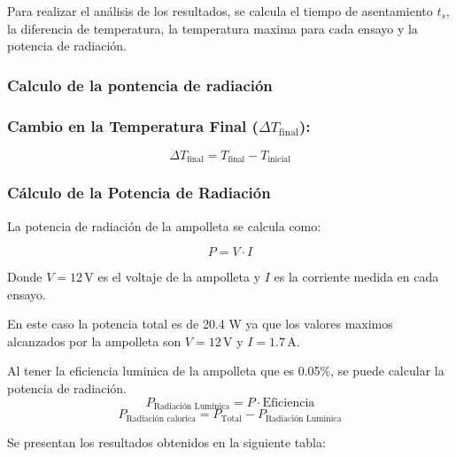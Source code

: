 \documentclass[spanish, a4paper, 11pt]{article}
\begin{document}
Para realizar el análisis de los resultados, se calcula el tiempo de asentamiento \( t_s \), la diferencia de temperatura, la temperatura maxima para cada ensayo y la potencia de radiación.

\subsubsection*{Calculo de la pontencia de radiación}

\subsubsection*{Cambio en la Temperatura Final (\( \Delta T_{\text{final}} \)):}
\[
\Delta T_{\text{final}} = T_{\text{final}} - T_{\text{inicial}}
\]


\subsubsection*{Cálculo de la Potencia de Radiación}

La potencia de radiación de la ampolleta se calcula como:

\[
P = V \cdot I
\]

Donde \( V = 12 \, \text{V} \) es el voltaje de la ampolleta y \( I \) es la corriente medida en cada ensayo.

En este caso la potencia total es de 20.4 W ya que los valores maximos alcanzados por la ampolleta son \( V = 12 \, \text{V} \) y \( I = 1.7 \, \text{A} \).

Al tener la eficiencia luminica de la ampolleta que es 0.05\%, se puede calcular la potencia de radiación.
\[
P_{\text{Radiación Luminica}} = P \cdot \text{Eficiencia}
\]
\[
P_{\text{Radiación calorica}} = P_{\text{Total}} - P_{\text{Radiación Luminica}}
\]

Se presentan los resultados obtenidos en la siguiente tabla:

\begin{table}[ht]
    \caption{Resultados de los ensayos de temperatura sin ventilador. 
    }
\end{table}
\end{document}
